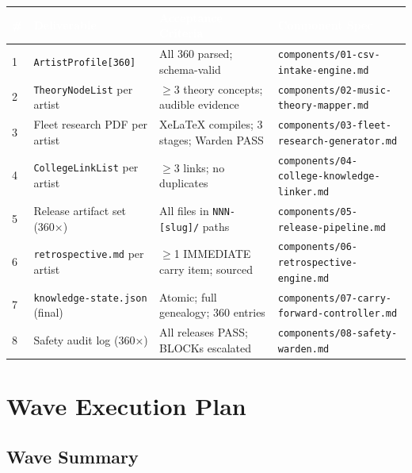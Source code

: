 \documentclass[11pt,letterpaper]{article}
\newcommand{\tblhdr}[1]{\textbf{\sffamily\textcolor{white}{#1}}}
\begin{document}
\begin{center}
\begin{tabularx}{\textwidth}{C{0.3cm}L{4cm}XL{4cm}}
\toprule
{}
\tblhdr{\#} & \tblhdr{Deliverable} & \tblhdr{Acceptance Criteria} & \tblhdr{Component Spec} \\
 & \texttt{ArtistProfile[360]} & All 360 parsed; schema-valid & \texttt{components/01-csv-intake-engine.md} \\
2 & \texttt{TheoryNodeList} per artist & $\geq$3 theory concepts; audible evidence & \texttt{components/02-music-theory-mapper.md} \\
3 & Fleet research PDF per artist & XeLaTeX compiles; 3 stages; Warden PASS & \texttt{components/03-fleet-research-generator.md} \\
4 & \texttt{CollegeLinkList} per artist & $\geq$3 links; no duplicates & \texttt{components/04-college-knowledge-linker.md} \\
5 & Release artifact set (360×) & All files in \texttt{NNN-[slug]/} paths & \texttt{components/05-release-pipeline.md} \\
6 & \texttt{retrospective.md} per artist & $\geq$1 IMMEDIATE carry item; sourced & \texttt{components/06-retrospective-engine.md} \\
7 & \texttt{knowledge-state.json} (final) & Atomic; full genealogy; 360 entries & \texttt{components/07-carry-forward-controller.md} \\
8 & Safety audit log (360×) & All releases PASS; BLOCKs escalated & \texttt{components/08-safety-warden.md} \\
\bottomrule
\end{tabularx}
\end{center}

\section{Wave Execution Plan}

\subsection{Wave Summary}
\end{document}
